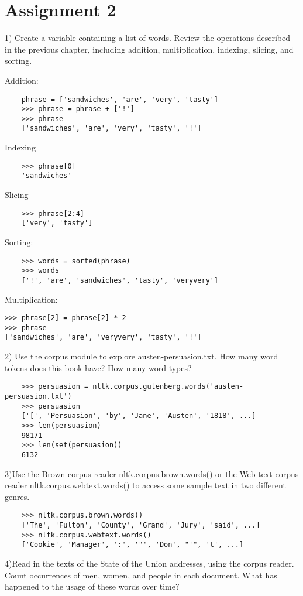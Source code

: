\documentclass[12pt]{article}
\begin{document}
	\section{Assignment 2}
	
	1) Create a variable  containing a list of words. Review the operations described in the previous chapter, including addition, multiplication, indexing, slicing, and sorting.  
	
	Addition:
		\begin{lstlisting}
	phrase = ['sandwiches', 'are', 'very', 'tasty']
	>>> phrase = phrase + ['!']
	>>> phrase
	['sandwiches', 'are', 'very', 'tasty', '!']
	\end{lstlisting}
	Indexing
	\begin{lstlisting}
	>>> phrase[0]
	'sandwiches'
	\end{lstlisting}
	Slicing
	\begin{lstlisting}
	>>> phrase[2:4]
	['very', 'tasty']
	\end{lstlisting}
	Sorting:
	\begin{lstlisting}
	>>> words = sorted(phrase)
	>>> words
	['!', 'are', 'sandwiches', 'tasty', 'veryvery']
	\end{lstlisting}
	Multiplication:
		\begin{lstlisting}
>>> phrase[2] = phrase[2] * 2
>>> phrase
['sandwiches', 'are', 'veryvery', 'tasty', '!']
	\end{lstlisting}
	
	2) Use the corpus module to explore austen-persuasion.txt. How many word tokens does this book have? How many word types?
	\begin{lstlisting}
	>>> persuasion = nltk.corpus.gutenberg.words('austen-persuasion.txt')
	>>> persuasion
	['[', 'Persuasion', 'by', 'Jane', 'Austen', '1818', ...]
	>>> len(persuasion)
	98171
	>>> len(set(persuasion))
	6132
	\end{lstlisting}
	
	3)Use the Brown corpus reader nltk.corpus.brown.words() or the Web text corpus reader nltk.corpus.webtext.words() to access some sample text in two different genres.
	\begin{lstlisting}
	>>> nltk.corpus.brown.words()
	['The', 'Fulton', 'County', 'Grand', 'Jury', 'said', ...]
	>>> nltk.corpus.webtext.words()
	['Cookie', 'Manager', ':', '"', 'Don', "'", 't', ...]
	\end{lstlisting}
	
	4)Read in the texts of the State of the Union addresses, using the  corpus reader. Count occurrences of men, women, and people in each document. What has happened to the usage of these words over time?
	\begin{lstlisting}

	\end{lstlisting}
	
\end{document}
